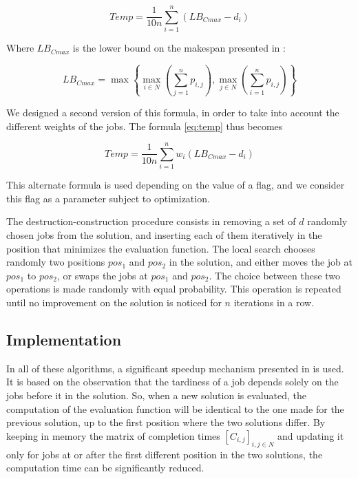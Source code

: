\documentclass[runningheads]{llncs}
\begin{document}
\begin{equation}
	\label{eq:temp}
	Temp=\frac{1}{10n}\sum_{i=1}^{n}(LB_{Cmax}-d_i)
\end{equation}

Where $LB_{Cmax}$ is the lower bound on the makespan presented in
\cite{taillard1993benchmarks}:

\begin{equation}
	LB_{Cmax} = \max\left\{\max_{i\in N}\left(\sum_{j=1}^n p_{i,j}\right), \max_{j\in N}\left(\sum_{i=1}^n p_{i,j}\right)\right\}
\end{equation}

We designed a second version of this formula, in order to take into account the
different weights of the jobs. The formula \ref{eq:temp} thus becomes

\begin{equation}
	Temp=\frac{1}{10n}\sum_{i=1}^{n}w_i(LB_{Cmax}-d_i)
\end{equation}

This alternate formula is used depending on the value of a flag, and we consider
this flag as a parameter subject to optimization.

The destruction-construction procedure consists in removing a set of $d$
randomly chosen jobs from the solution, and inserting each of them iteratively
in the position that minimizes the evaluation function. The local search chooses
randomly two positions $pos_1$ and $pos_2$ in the solution, and either moves the
job at $pos_1$ to $pos_2$, or swaps the jobs at $pos_1$ and $pos_2$. The choice
between these two operations is made randomly with equal probability. This
operation is repeated until no improvement on the solution is noticed for $n$
iterations in a row.

\subsection{Implementation}

In all of these algorithms, a significant speedup mechanism presented in
\cite{li2009efficient} is used. It is based on the observation that the
tardiness of a job depends solely on the jobs before it in the solution. So,
when a new solution is evaluated, the computation of the evaluation function
will be identical to the one made for the previous solution, up to the first
position where the two solutions differ. By keeping in memory the matrix of
completion times $[C_{i,j}]_{i,j\in N}$ and updating it only for jobs at or
after the first different position in the two solutions, the computation time
can be significantly reduced.
\end{document}
